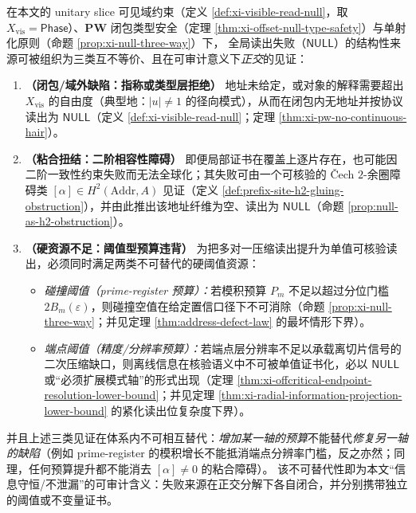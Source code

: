 \begin{theorem}\label{thm:xi-null-orthogonal-trichotomy-resource-nonsubstitutable}
在本文的 unitary slice 可见域约束（定义 \ref{def:xi-visible-read-null}，取 \(X_{\mathrm{vis}}=\mathsf{Phase}\)）、\(\mathbf{PW}\) 闭包类型安全（定理 \ref{thm:xi-offset-null-type-safety}）与单射化原则（命题 \ref{prop:xi-null-three-way}）下，
全局读出失败（\(\mathsf{NULL}\)）的结构性来源可被组织为三类互不等价、且在可审计意义下\emph{正交}的见证：
\begin{enumerate}
  \item \textbf{（闭包/域外缺陷：指称或类型层拒绝）}
  地址未给定，或对象的解释需要超出 \(X_{\mathrm{vis}}\) 的自由度（典型地：\(|u|\neq 1\) 的径向模式），从而在闭包内无地址并按协议读出为 \(\mathsf{NULL}\)（定义 \ref{def:xi-visible-read-null}；定理 \ref{thm:xi-pw-no-continuous-hair}）。
  \item \textbf{（粘合扭结：二阶相容性障碍）}
  即便局部证书在覆盖上逐片存在，也可能因二阶一致性约束失败而无法全球化；其失败可由一个可核验的 Čech \(2\)-余圈障碍类 \([\alpha]\in H^2(\mathrm{Addr},A)\) 见证（定义 \ref{def:prefix-site-h2-gluing-obstruction}），并由此推出该地址纤维为空、读出为 \(\mathsf{NULL}\)（命题 \ref{prop:null-as-h2-obstruction}）。
  \item \textbf{（硬资源不足：阈值型预算违背）}
  为把多对一压缩读出提升为单值可核验读出，必须同时满足两类不可替代的硬阈值资源：
  \begin{itemize}
    \item \emph{碰撞阈值（prime-register 预算）：}若模积预算 \(P_m\) 不足以超过分位门槛 \(2B_m(\varepsilon)\)，则碰撞空值在给定置信口径下不可消除（命题 \ref{prop:xi-null-three-way}；并见定理 \ref{thm:address-defect-law} 的最坏情形下界）。  
    \item \emph{端点阈值（精度/分辨率预算）：}若端点层分辨率不足以承载离切片信号的二次压缩缺口，则离线信息在核验语义中不可被单值证书化，必以 \(\mathsf{NULL}\) 或“必须扩展模式轴”的形式出现（定理 \ref{thm:xi-offcritical-endpoint-resolution-lower-bound}；并见定理 \ref{thm:xi-radial-information-projection-lower-bound} 的紧化读出位复杂度下界）。
  \end{itemize}
\end{enumerate}
并且上述三类见证在体系内不可相互替代：\emph{增加某一轴的预算}不能替代\emph{修复另一轴的缺陷}（例如 prime-register 的模积增长不能抵消端点分辨率门槛，反之亦然；同理，任何预算提升都不能消去 \([\alpha]\neq 0\) 的粘合障碍）。
该不可替代性即为本文“信息守恒/不泄漏”的可审计含义：失败来源在正交分解下各自闭合，并分别携带独立的阈值或不变量证书。
\end{theorem}

